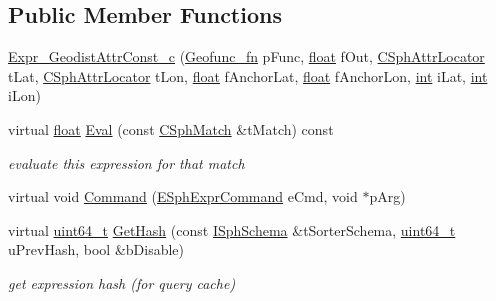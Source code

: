 \subsection*{Public Member Functions}
\begin{DoxyCompactItemize}
\item 
\hyperlink{classExpr__GeodistAttrConst__c_aa16ff91204bf12d29152cc7ba64e4742}{Expr\-\_\-\-Geodist\-Attr\-Const\-\_\-c} (\hyperlink{sphinxexpr_8cpp_a162dd05806302c01435e9c554f017be4}{Geofunc\-\_\-fn} p\-Func, \hyperlink{sphinxexpr_8cpp_a0e0d0739f7035f18f949c2db2c6759ec}{float} f\-Out, \hyperlink{structCSphAttrLocator}{C\-Sph\-Attr\-Locator} t\-Lat, \hyperlink{structCSphAttrLocator}{C\-Sph\-Attr\-Locator} t\-Lon, \hyperlink{sphinxexpr_8cpp_a0e0d0739f7035f18f949c2db2c6759ec}{float} f\-Anchor\-Lat, \hyperlink{sphinxexpr_8cpp_a0e0d0739f7035f18f949c2db2c6759ec}{float} f\-Anchor\-Lon, \hyperlink{sphinxexpr_8cpp_a4a26e8f9cb8b736e0c4cbf4d16de985e}{int} i\-Lat, \hyperlink{sphinxexpr_8cpp_a4a26e8f9cb8b736e0c4cbf4d16de985e}{int} i\-Lon)
\item 
virtual \hyperlink{sphinxexpr_8cpp_a0e0d0739f7035f18f949c2db2c6759ec}{float} \hyperlink{classExpr__GeodistAttrConst__c_a449b3d92e3d64ebd8bbdd038e71deda6}{Eval} (const \hyperlink{classCSphMatch}{C\-Sph\-Match} \&t\-Match) const 
\begin{DoxyCompactList}\small\item\em evaluate this expression for that match \end{DoxyCompactList}\item 
virtual void \hyperlink{classExpr__GeodistAttrConst__c_ac2c3fd0ea7faa588b0fed56d3e38375f}{Command} (\hyperlink{sphinxexpr_8h_a30be184fb07bd80c271360fc6094c818}{E\-Sph\-Expr\-Command} e\-Cmd, void $\ast$p\-Arg)
\item 
virtual \hyperlink{sphinxstd_8h_aaa5d1cd013383c889537491c3cfd9aad}{uint64\-\_\-t} \hyperlink{classExpr__GeodistAttrConst__c_a0b3a7c8a313e93b93abfcca577098b63}{Get\-Hash} (const \hyperlink{classISphSchema}{I\-Sph\-Schema} \&t\-Sorter\-Schema, \hyperlink{sphinxstd_8h_aaa5d1cd013383c889537491c3cfd9aad}{uint64\-\_\-t} u\-Prev\-Hash, bool \&b\-Disable)
\begin{DoxyCompactList}\small\item\em get expression hash (for query cache) \end{DoxyCompactList}\end{DoxyCompactItemize}
